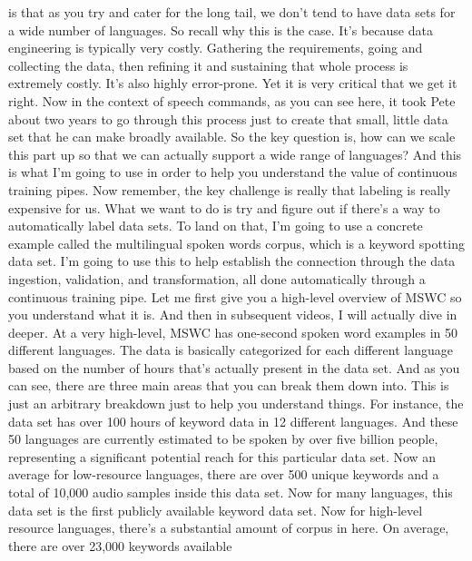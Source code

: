 {{{{    is that as you try and cater for the long tail,
    we don't tend to have data sets for a wide number of languages.
    So recall why this is the case.
    It's because data engineering is typically very costly.
    Gathering the requirements, going and collecting the data,
    then refining it and sustaining that whole process is extremely costly.
    It's also highly error-prone.
    Yet it is very critical that we get it right.
    Now in the context of speech commands, as you can see here,
    it took Pete about two years to go through this process just
    to create that small, little data set that he can make broadly available.
    So the key question is, how can we scale this part up so that we can actually
    support a wide range of languages?
    And this is what I'm going to use in order
    to help you understand the value of continuous training pipes.
    Now remember, the key challenge is really
    that labeling is really expensive for us.
    What we want to do is try and figure out if there's
    a way to automatically label data sets.
    To land on that, I'm going to use a concrete example called
    the multilingual spoken words corpus, which is a keyword spotting data set.
    I'm going to use this to help establish the connection through the data
    ingestion, validation, and transformation,
    all done automatically through a continuous training pipe.
    Let me first give you a high-level overview of MSWC
    so you understand what it is.
    And then in subsequent videos, I will actually dive in deeper.
    At a very high-level, MSWC has one-second
    spoken word examples in 50 different languages.
    The data is basically categorized for each different language
    based on the number of hours that's actually present in the data set.
    And as you can see, there are three main areas
    that you can break them down into.
    This is just an arbitrary breakdown just to help you understand things.
    For instance, the data set has over 100 hours
    of keyword data in 12 different languages.
    And these 50 languages are currently estimated
    to be spoken by over five billion people,
    representing a significant potential reach for this particular data set.
    Now an average for low-resource languages,
    there are over 500 unique keywords and a total of 10,000 audio samples
    inside this data set.
    Now for many languages, this data set is the first publicly available
    keyword data set.
    Now for high-level resource languages, there's
    a substantial amount of corpus in here.
    On average, there are over 23,000 keywords available
}}}}
